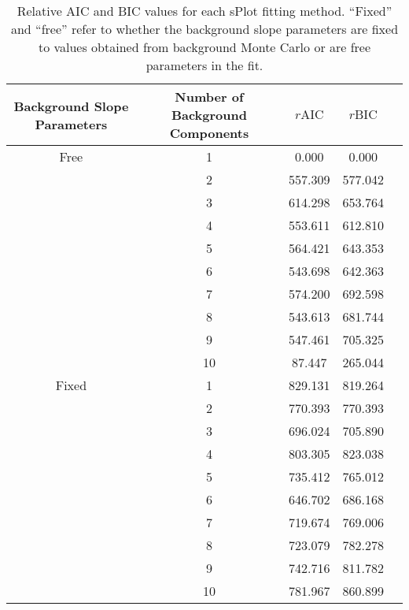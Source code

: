 \begin{table}[ht]
    \begin{center}
        \begin{tabular}{ccccc}\toprule
        Background Slope Parameters & Number of Background Components & $r\text{AIC}$ & $r\text{BIC}$\\\midrule
        Free & 1 & 0.000 & 0.000 \\
         & 2 & 557.309 & 577.042 \\
         & 3 & 614.298 & 653.764 \\
         & 4 & 553.611 & 612.810 \\
         & 5 & 564.421 & 643.353 \\
         & 6 & 543.698 & 642.363 \\
         & 7 & 574.200 & 692.598 \\
         & 8 & 543.613 & 681.744 \\
         & 9 & 547.461 & 705.325 \\
         & 10 & 87.447 & 265.044 \\
        Fixed & 1 & 829.131 & 819.264 \\
         & 2 & 770.393 & 770.393 \\
         & 3 & 696.024 & 705.890 \\
         & 4 & 803.305 & 823.038 \\
         & 5 & 735.412 & 765.012 \\
         & 6 & 646.702 & 686.168 \\
         & 7 & 719.674 & 769.006 \\
         & 8 & 723.079 & 782.278 \\
         & 9 & 742.716 & 811.782 \\
         & 10 & 781.967 & 860.899 \\\bottomrule
        \end{tabular}
        \caption{Relative AIC and BIC values for each sPlot fitting method. ``Fixed'' and ``free'' refer to whether the background slope parameters are fixed to values obtained from background Monte Carlo or are free parameters in the fit.}\label{tab:splot-model-results}
    \end{center}
\end{table}